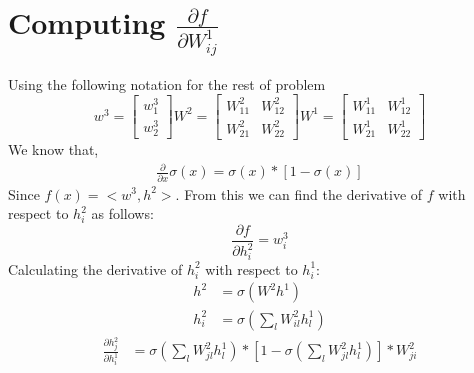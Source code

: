\documentclass[english,a4paper,12pt]{article}
\begin{document}
\section{Computing $\frac{\partial f}{\partial W_{ij}^{1}}$}{
Using the following notation for the rest of problem\\
    \begin{equation*}
        w^{3} = \begin{bmatrix}
                  w_{1}^{3} \\
                  w_{2}^{3}
                \end{bmatrix}
        W^{2} = \begin{bmatrix}
                    W_{11}^{2} & W_{12}^{2}\\
                    W_{21}^{2} & W_{22}^{2}
                \end{bmatrix}
        W^{1} = \begin{bmatrix}
                    W_{11}^{1} & W_{12}^{1}\\
                    W_{21}^{1} & W_{22}^{1}
                \end{bmatrix}
    \end{equation*}
    We know that,
        \begin{equation*}
             \begin{split}
                 \frac{\partial}{\partial x} \sigma(x) = \sigma(x) * [1 - \sigma(x)]
             \end{split}
        \end{equation*}
    Since $f(x) = <w^{3},h^{2}>$. From this we can find the derivative of $f$ with respect to $h_{i}^{2}$ as follows:
        \begin{equation*}
            \frac{\partial f}{\partial h_{i}^{2}} = w_{i}^{3}
        \end{equation*}
    Calculating the derivative of $h_{i}^{2}$ with respect to $h_{i}^{1}$:
        \begin{equation*}
            \begin{split}
                h^{2} & = \sigma(W^{2}h^{1})\\
                h_{i}^{2} & = \sigma(\sum_{l}W_{il}^{2}h_{l}^{1})
            \end{split}
        \end{equation*}
        \begin{equation*}
            \begin{split}
                \frac{\partial h_{j}^{2}}{\partial h_{i}^{1}} & = \sigma(\sum_{l}W_{jl}^{2}h_{l}^{1}) * [1 - \sigma(\sum_{l}W_{jl}^{2}h_{l}^{1})] * W_{ji}^{2}\\

\end{split}
\end{equation*}}
\end{document}
